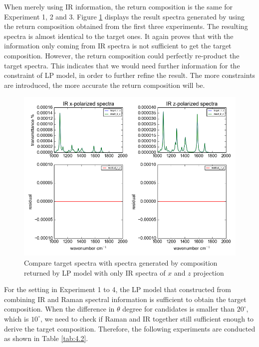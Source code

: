 When merely using IR information, the return composition is the same for Experiment 1, 2 and 3. Figure \ref{fig:4.1} displays the result spectra generated by using the return composition obtained from the first three experiments. The resulting spectra is almost identical to the target ones. It again proves that with the information only coming from IR spectra is not sufficient to get the target composition.  However, the return composition could perfectly re-product the target spectra. This indicates that we would need further information for the constraint of LP model, in order to further refine the result. The more constraints are introduced, the more accurate the return composition will be. \\

\begin{figure}[!ht]
\centering
\includegraphics[scale=0.7]{Figures/ir_xz_result_plotting.png}
\caption{Compare target spectra with spectra generated by composition returned by LP model with only IR spectra of $x$ and $z$ projection}  \label{fig:4.1}
\end{figure}

For the setting in Experiment 1 to 4, the LP model that constructed from combining IR and Raman spectral information is sufficient to obtain the target composition. When the difference in $\theta$ degree for candidates is smaller than $20^{\circ}$, which is $10^{\circ}$, we need to check if Raman and IR together still sufficient enough to derive the target composition. Therefore, the following experiments are conducted as shown in Table \ref{tab:4.2}. \\

